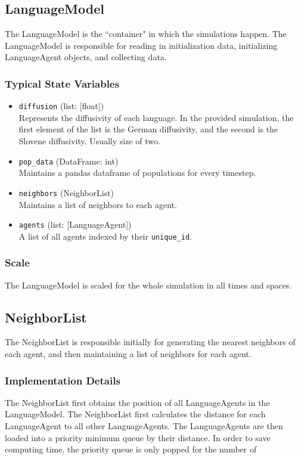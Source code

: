 \documentclass{article}
\begin{document}
\subsection{LanguageModel}
The LanguageModel is the ``container" in which the simulations happen. The LanguageModel is responsible for reading in initialization data, initializing LanguageAgent objects, and collecting data.

\subsubsection{Typical State Variables}
\begin{itemize}
\item \texttt{diffusion} (list: [float]) \\
Represents the diffusivity of each language. In the provided simulation, the first element of the list is the German diffusivity, and the second is the Slovene diffusivity. Usually size of two.

\item \texttt{pop\_data} (DataFrame: int) \\
Maintains a pandas dataframe of populations for every timestep.

\item \texttt{neighbors} (NeighborList) \\
Maintains a list of neighbors to each agent.

\item \texttt{agents} (list: [LanguageAgent]) \\
A list of all agents indexed by their \texttt{unique\_id}.

\end{itemize}

\subsubsection{Scale}
The LanguageModel is scaled for the whole simulation in all times and spaces.

\subsection{NeighborList}
The NeighborList is responsible initially for generating the nearest neighbors of each agent, and then maintaining a list of neighbors for each agent.

\subsubsection{Implementation Details}
The NeighborList first obtains the position of all LanguageAgents in the LanguageModel. The NeighborList first calculates the distance for each LanguageAgent to all other LanguageAgents. The LanguageAgents are then loaded into a priority minimum queue by their distance. In order to save computing time, the priority queue is only popped for the number of 
\end{document}
